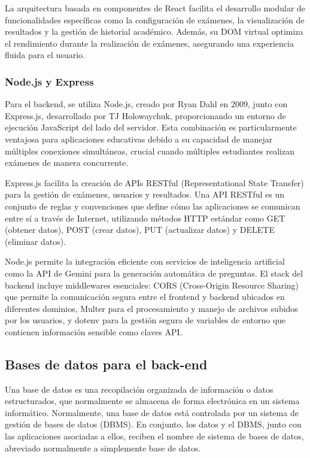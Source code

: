 \documentclass[12pt,a4paper]{report}
\begin{document}
La arquitectura basada en componentes de React facilita el desarrollo modular de funcionalidades específicas como la configuración de exámenes, la visualización de resultados y la gestión de historial académico. Además, su DOM virtual optimiza el rendimiento durante la realización de exámenes, asegurando una experiencia fluida para el usuario.

\subsubsection{Node.js y Express}

Para el backend, se utiliza Node.js, creado por Ryan Dahl en 2009, junto con Express.js, desarrollado por TJ Holowaychuk, proporcionando un entorno de ejecución JavaScript del lado del servidor. Esta combinación es particularmente ventajosa para aplicaciones educativas debido a su capacidad de manejar múltiples conexiones simultáneas, crucial cuando múltiples estudiantes realizan exámenes de manera concurrente.

Express.js facilita la creación de APIs RESTful (Representational State Transfer) para la gestión de exámenes, usuarios y resultados. Una API RESTful es un conjunto de reglas y convenciones que define cómo las aplicaciones se comunican entre sí a través de Internet, utilizando métodos HTTP estándar como GET (obtener datos), POST (crear datos), PUT (actualizar datos) y DELETE (eliminar datos). 

Node.js permite la integración eficiente con servicios de inteligencia artificial como la API de Gemini para la generación automática de preguntas. El stack del backend incluye middlewares esenciales: CORS (Cross-Origin Resource Sharing) que permite la comunicación segura entre el frontend y backend ubicados en diferentes dominios, Multer para el procesamiento y manejo de archivos subidos por los usuarios, y dotenv para la gestión segura de variables de entorno que contienen información sensible como claves API.

\subsection{Bases de datos para el back-end}

Una base de datos es una recopilación organizada de información o datos estructurados, que normalmente se almacena de forma electrónica en un sistema informático. Normalmente, una base de datos está controlada por un sistema de gestión de bases de datos (DBMS). En conjunto, los datos y el DBMS, junto con las aplicaciones asociadas a ellos, reciben el nombre de sistema de bases de datos, abreviado normalmente a simplemente base de datos.
\end{document}
